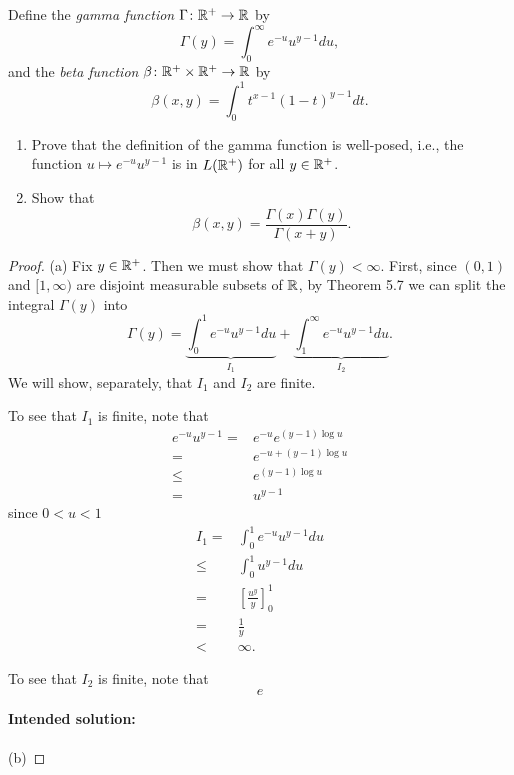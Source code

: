 \begin{problem}
Define the \emph{gamma function} $\Gamma\colon\mathbb{R}^+\to\mathbb{R}$ by
\[
\Gamma(y)=\int_0^\infty e^{-u}u^{y-1} d  u,
\]
and the \emph{beta function} $\beta\colon\mathbb{R}^+\times\mathbb{R}^+\to\mathbb{R}$
by
\[
\beta(x,y)=\int_0^1 t^{x-1}(1-t)^{y-1} d  t.
\]
\begin{enumerate}[label=(\alph*)]
\item Prove that the definition of the gamma function is well-posed, i.e.,
the function $u\mapsto e^{-u}u^{y-1}$ is in $L(\mathbb{R}^+)$ for all
$y\in\mathbb{R}^+$.
\item Show that
\[
\beta(x,y)=\frac{\Gamma(x)\Gamma(y)}{\Gamma(x+y)}.
\]
\end{enumerate}
\end{problem}
\begin{proof}
(a) Fix $y\in\mathbb{R}^+$. Then we must show that $\Gamma(y)<\infty$. First,
since $(0,1)$ and $[1,\infty)$ are disjoint measurable subsets of $\mathbb{R}$,
by Theorem 5.7 we can split the integral $\Gamma(y)$ into
\begin{equation}
\label{eq:split-integral-5}
\Gamma(y)=\underbrace{\int_0^1 e^{-u}u^{y-1} d  u}_{I_1}
+\underbrace{\int_1^\infty e^{-u}u^{y-1} d  u}_{I_2}.
\end{equation}
We will show, separately, that $I_1$ and $I_2$ are finite.

To see that $I_1$ is finite, note that
\begin{equation}
\label{eq:estimate-1-5}
\begin{aligned}
e^{-u}u^{y-1}={}&e^{-u}e^{(y-1)\log u}\\
={}&e^{-u+(y-1)\log u}\\
\leq{}&e^{(y-1)\log u}\\
={}&u^{y-1}
\end{aligned}
\end{equation}
since $0<u<1$
\begin{equation}
\label{eq:estimate-i-1-5}
\begin{aligned}
I_1={}&\int_0^1 e^{-u}u^{y-1} d  u\\
\leq{}&\int_0^1 u^{y-1} d  u\\
={}&\left[\frac{u^y}{y}\right]_0^1\\
={}&\frac{1}{y}\\
<{}&\infty.
\end{aligned}
\end{equation}

To see that $I_2$ is finite, note that
\begin{equation}
\label{eq:estimate-2-5}
e
\end{equation}

\textbf{Intended solution:}
\\\\
(b)
\end{proof}

